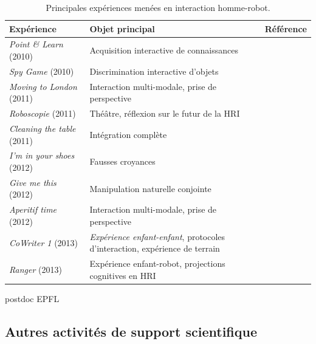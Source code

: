 \documentclass[a4paper]{article}
\begin{document}
\begin{table}
\begin{center}

    \begin{tabular}{lp{5.5cm}l}
\bf{Expérience} & Objet principal & Référence \\
\hline
{\it Point \& Learn} (2010) & Acquisition interactive de connaissances & \cite{Lemaignan2010} \\
{\it Spy Game} (2010) & Discrimination interactive d'objets & \cite{ros2010which} \\
{\it Moving to London} (2011) & Interaction multi-modale, \newline prise de perspective & \cite{lemaignan2011what} \\
{\it Roboscopie} (2011) & Théâtre, \newline réflexion sur le futur de la HRI & \cite{lemaignan2012roboscopie} \\
{\it Cleaning the table} (2011) & Intégration complète & \cite{alami2011when} \\
{\it I'm in your shoes} (2012) & Fausses croyances & \cite{Warnier2012a} \\
{\it Give me this} (2012) & Manipulation naturelle conjointe & \cite{gharbi2013natural} \\
{\it Aperitif time} (2012) & Interaction multi-modale, \newline prise de perspective & \cite{lemaignan2013talking} \\
{\it CoWriter 1} (2013) & \emph{Expérience enfant-enfant}, \newline protocoles
d'interaction, expérience de terrain &  \\
{\it Ranger} (2013) & Expérience enfant-robot, \newline projections cognitives en HRI &
\cite{fink2014which, lemaignan2014dynamics} \\
\hline

\end{tabular}
\end{center}
\caption{Principales expériences menées en interaction homme-robot.}
\label{experiences}
\end{table}

postdoc EPFL

\cite{fink2014which}


\subsection{Autres activités de support scientifique}
\end{document}
